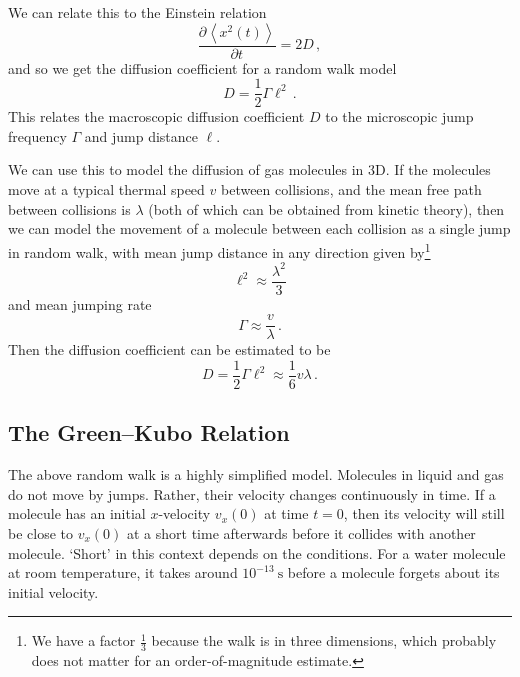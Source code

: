 \documentclass{article}
\theoremstyle{plain}\theoremheaderfont{\normalfont\bfseries}\theorembodyfont{\rmfamily}\theoremseparator{.}\newtheorem*{thm}{Theorem}\newtheorem*{law}{Law}\newtheorem*{pos}{Postulate}
\numberwithin{equation}{section}
\newcommand{\unit}[1]{\ \mathrm{#1}}
\newcommand{\pdv}[3][]{\frac{\partial^{#1} #2}{{\partial #3}^{#1}}}
\newcommand{\eval}[1]{\left\langle #1 \right\rangle}
\begin{document}
    We can relate this to the Einstein relation
    \begin{equation}
        \pdv{\eval{x^2(t)}}{t}=2D\,,
    \end{equation}
    and so we get the diffusion coefficient for a random walk model
    \begin{equation}
        D=\frac{1}{2}\Gamma \ell^2\,.
    \end{equation}
    This relates the macroscopic diffusion coefficient \(D\) to the microscopic jump frequency \(\Gamma\) and jump distance \(\ell\).

    We can use this to model the diffusion of gas molecules in 3D. If the molecules move at a typical thermal speed \(v\) between collisions, and the mean free path between collisions is \(\lambda\) (both of which can be obtained from kinetic theory), then we can model the movement of a molecule between each collision as a single jump in random walk, with mean jump distance in any direction given by\footnote{We have a factor \(\frac{1}{3}\) because the walk is in three dimensions, which probably does not matter for an order-of-magnitude estimate.}
    \begin{equation}
        \ell^2\approx\frac{\lambda^2}{3}
    \end{equation}
    and mean jumping rate
    \begin{equation}
        \Gamma\approx\frac{v}{\lambda}\,.
    \end{equation}
    Then the diffusion coefficient can be estimated to be
    \begin{equation}
        D=\frac{1}{2}\Gamma\ell^2\approx\frac{1}{6}v\lambda\,.
    \end{equation}

    \subsection{The Green--Kubo Relation}
    The above random walk is a highly simplified model. Molecules in liquid and gas do not move by jumps. Rather, their velocity changes continuously in time. If a molecule has an initial \(x\)-velocity \(v_x(0)\) at time \(t=0\), then its velocity will still be close to \(v_x(0)\) at a short time afterwards before it collides with another molecule. `Short' in this context depends on the conditions. For a water molecule at room temperature, it takes around \(10^{-13}\unit{s}\) before a molecule forgets about its initial velocity.
\end{document}
